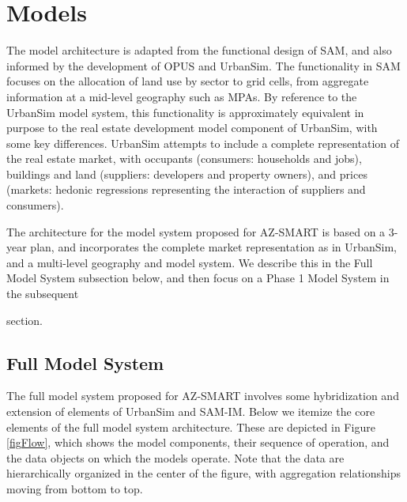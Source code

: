 \section{Models}

The model architecture is adapted from the functional design of SAM,
and also informed by the development of OPUS and UrbanSim. The
functionality in SAM focuses on the allocation of land use by
sector to grid cells, from aggregate information at a mid-level
geography such as MPAs.  By reference to the UrbanSim model system,
this functionality is approximately equivalent in purpose to the
real estate development model component of UrbanSim, with some key
differences.  UrbanSim attempts to include a complete representation
of the real estate market, with occupants (consumers: households
and jobs), buildings and land (suppliers: developers and property
owners), and prices (markets: hedonic regressions representing the
interaction of suppliers and consumers).

The architecture for the model system proposed for AZ-SMART is based
on a 3-year plan, and incorporates the complete market
representation as in UrbanSim, and a multi-level geography and model
system.  We describe this in the Full Model System subsection below,
and then focus on a Phase 1 Model System in the subsequent

 section.

\subsection{Full Model System}
The full model system proposed for AZ-SMART involves some
hybridization and extension of elements of UrbanSim and SAM-IM.
Below we itemize the core elements of the full model system
architecture.  These are depicted in Figure \ref{figFlow}, which
shows the model components, their sequence of operation, and the
data objects on which the models operate.  Note that the data are
hierarchically organized in the center of the figure, with
aggregation relationships moving from bottom to top.


